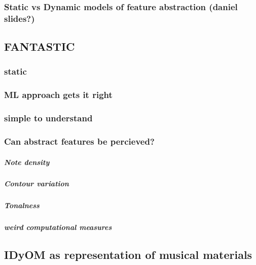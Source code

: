 \documentclass[]{book}
\let\oldsubparagraph\subparagraph
\renewcommand{\subparagraph}[1]{\oldsubparagraph{#1}\mbox{}}
\theoremstyle{definition}
\theoremstyle{definition}
\theoremstyle{definition}
\theoremstyle{remark}
\begin{document}
\hypertarget{static-vs-dynamic-models-of-feature-abstraction-daniel-slides}{%
\subsubsection{Static vs Dynamic models of feature abstraction (daniel
slides?)}\label{static-vs-dynamic-models-of-feature-abstraction-daniel-slides}}

\hypertarget{fantastic}{%
\subsection{FANTASTIC}\label{fantastic}}

\hypertarget{static}{%
\subsubsection{static}\label{static}}

\hypertarget{ml-approach-gets-it-right}{%
\subsubsection{ML approach gets it
right}\label{ml-approach-gets-it-right}}

\hypertarget{simple-to-understand}{%
\subsubsection{simple to understand}\label{simple-to-understand}}

\hypertarget{can-abstract-features-be-percieved}{%
\subsubsection{Can abstract features be
percieved?}\label{can-abstract-features-be-percieved}}

\hypertarget{note-density}{%
\subparagraph{Note density}\label{note-density}}

\hypertarget{contour-variation}{%
\subparagraph{Contour variation}\label{contour-variation}}

\hypertarget{tonalness}{%
\subparagraph{Tonalness}\label{tonalness}}

\hypertarget{weird-computational-measures}{%
\subparagraph{weird computational
measures}\label{weird-computational-measures}}

\hypertarget{idyom-as-representation-of-musical-materials}{%
\subsection{IDyOM as representation of musical
materials}\label{idyom-as-representation-of-musical-materials}}
\end{document}
